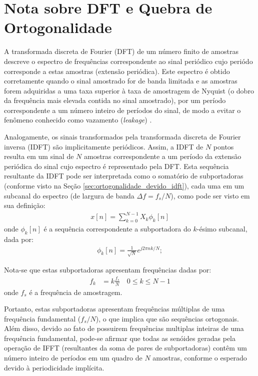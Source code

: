 \chapter{Nota sobre DFT e Quebra de Ortogonalidade}
\label{app:ortogonalidade}

A transformada discreta de Fourier (DFT) de um número finito de amostras descreve o espectro de frequências correspondente ao sinal periódico cujo periódo corresponde a estas amostras (extensão periódica). Este espectro é obtido corretamente quando o sinal amostrado for de banda limitada e as amostras forem adquiridas a uma taxa superior à taxa de amostragem de Nyquist (o dobro da frequência mais elevada contida no sinal amostrado), por um período correspondente a um número inteiro de períodos do sinal, de modo a evitar o fenômeno conhecido como vazamento (\emph{leakage}) \cite{dspambardar}. 

Analogamente, os sinais transformados pela transformada discreta de Fourier inversa (IDFT) são implicitamente periódicos. Assim, a IDFT de $N$ pontos resulta em um sinal de $N$ amostras correspondente a um período da extensão periódica do sinal cujo espectro é representado pela DFT. Esta sequência resultante da IDFT pode ser interpretada como o somatório de subportadoras (conforme visto na Seção \ref{sec:ortogonalidade_devido_idft}), cada uma em um subcanal do espectro (de largura de banda $\Delta f = f_s/N$), como pode ser visto em sua definição:
\begin{align}
x[n] = \sum \limits_{k=0}^{N-1} X_k \phi_k[n]
\end{align}
onde $\phi_k[n]$ é a sequência correspondente a subportadora do $k$-ésimo subcanal, dada por:
\begin{align}
\phi_k[n] = \frac{1}{\sqrt{N}}e^{j2\pi n k/N};
\end{align}

Nota-se que estas subportadoras apresentam frequências dadas por:
\begin{align}
f_k&=k\frac{f_s}{N} \quad 0 \leq k \leq N - 1 
\label{eq:ortho_freq}
\end{align}
onde $f_s$ é a frequência de amostragem.

Portanto, estas subportadoras apresentam frequências múltiplas de uma frequência fundamental ($f_s/N$), o que implica que são sequências ortogonais. Além disso, devido ao fato de possuirem frequências multiplas inteiras de uma frequência fundamental, pode-se afirmar que todas as senóides geradas pela operação de IFFT (resultantes da soma de pares de subportadoras) contêm um número inteiro de períodos em um quadro de $N$ amostras, conforme o esperado devido à periodicidade implícita.

